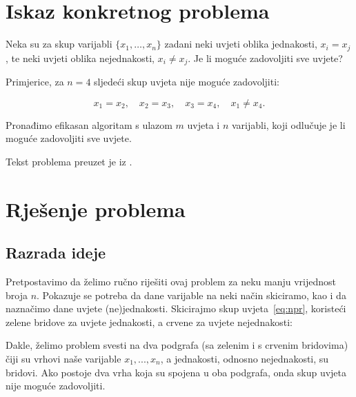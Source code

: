 \documentclass[12pt]{scrartcl}
\begin{document}
\section{Iskaz konkretnog problema}

Neka su za skup varijabli $\{x_1,\dotsc,x_n\}$ zadani neki uvjeti oblika jednakosti, $x_i=x_j$, te neki uvjeti oblika nejednakosti, $x_i\neq x_j$. Je li moguće zadovoljiti sve uvjete?

Primjerice, za $n=4$ sljedeći skup uvjeta nije moguće zadovoljiti:

\begin{equation}\label{eq:npr}
    x_1=x_2,\quad x_2=x_3,\quad x_3=x_4,\quad x_1\neq x_4.
\end{equation}

Pronađimo efikasan algoritam s ulazom $m$ uvjeta i $n$ varijabli, koji odlučuje je li moguće zadovoljiti sve uvjete. 

Tekst problema preuzet je iz \cite{dasgupta}.

\section{Rješenje problema}

\subsection{Razrada ideje}

Pretpostavimo da želimo ručno riješiti ovaj problem za neku manju vrijednost broja $n$. Pokazuje se potreba da dane varijable na neki način skiciramo, kao i da naznačimo dane uvjete (ne)jednakosti. Skicirajmo skup uvjeta~\eqref{eq:npr}, koristeći zelene bridove za uvjete jednakosti, a crvene za uvjete nejednakosti:

\begin{center}
\end{center}

Dakle, želimo problem svesti na dva podgrafa (sa zelenim i s crvenim bridovima) čiji su vrhovi naše varijable $x_1,...,x_n$, a jednakosti, odnosno nejednakosti, su bridovi. Ako postoje dva vrha koja su spojena u oba podgrafa, onda skup uvjeta nije moguće zadovoljiti.
\end{document}
